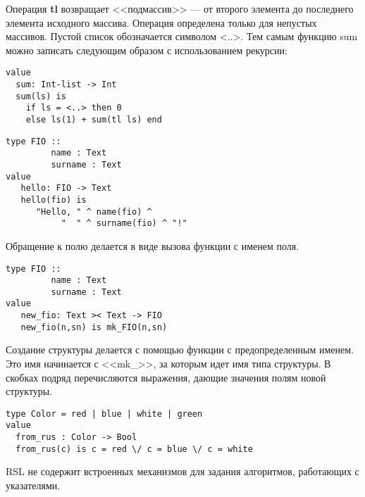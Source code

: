 Операция \textbf{tl} возвращает <<подмассив>> --- от второго элемента до последнего элемента исходного массива. Операция определена только для непустых массивов. Пустой список обозначается символом <..>. Тем самым функцию sum можно записать следующим образом с использованием рекурсии:
\begin{lstlisting}
value
  sum: Int-list -> Int
  sum(ls) is
    if ls = <..> then 0
    else ls(1) + sum(tl ls) end
\end{lstlisting}


\begin{lstlisting}
type FIO ::
         name : Text
         surname : Text
value
   hello: FIO -> Text
   hello(fio) is
      "Hello, " ^ name(fio) ^
           "  " ^ surname(fio) ^ "!"
\end{lstlisting}

Обращение к полю делается в виде вызова функции с именем поля.

\begin{lstlisting}
type FIO ::
         name : Text
         surname : Text
value
   new_fio: Text >< Text -> FIO
   new_fio(n,sn) is mk_FIO(n,sn)
\end{lstlisting}

Создание структуры делается с помощью функции с предопределенным именем. Это имя начинается с <<mk\_>>, за которым идет имя типа структуры. В скобках подряд перечисляются выражения, дающие значения полям новой структуры.

\begin{lstlisting}
type Color = red | blue | white | green
value
  from_rus : Color -> Bool
  from_rus(c) is c = red \/ c = blue \/ c = white
\end{lstlisting}

RSL не содержит встроенных механизмов для задания алгоритмов, работающих с указателями.
